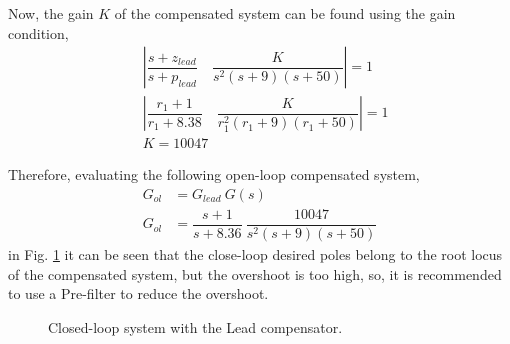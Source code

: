 \documentclass[11pt, a4paper]{article}
\begin{document}
Now, the gain $K$ of the compensated system can be found using the gain condition,
\begin{align}
&\left|  \dfrac{s+z_{lead}}{s+p_{lead}} \quad \dfrac{K}{s^2(s+9)(s+50)} \right| = 1 \nonumber\\
&\left|  \dfrac{r_1+1}{r_1+8.38} \quad \dfrac{K}{r_1^2(r_1+9)(r_1+50)} \right| = 1 \nonumber\\
&K = 10047 \nonumber
\end{align}

Therefore, evaluating the following open-loop compensated system,
\begin{align}
G_{ol} &= G_{lead} ~G(s) \label{eq:Gol_lead}\\ 
G_{ol} &= \dfrac{s+1}{s+8.36}~ \dfrac{10047}{s^2(s+9)(s+50)}  \nonumber
\end{align}
in Fig. \ref{fig:Q2_lead} it can be seen that the close-loop desired poles belong to the root locus of the compensated system, but the overshoot is too high, so, it is recommended to use a Pre-filter to reduce the overshoot.
\begin{figure}[!ht]
	\centering
	\caption{Closed-loop system with the Lead compensator.}
	\label{fig:Q2_lead}
\end{figure}
\end{document}
